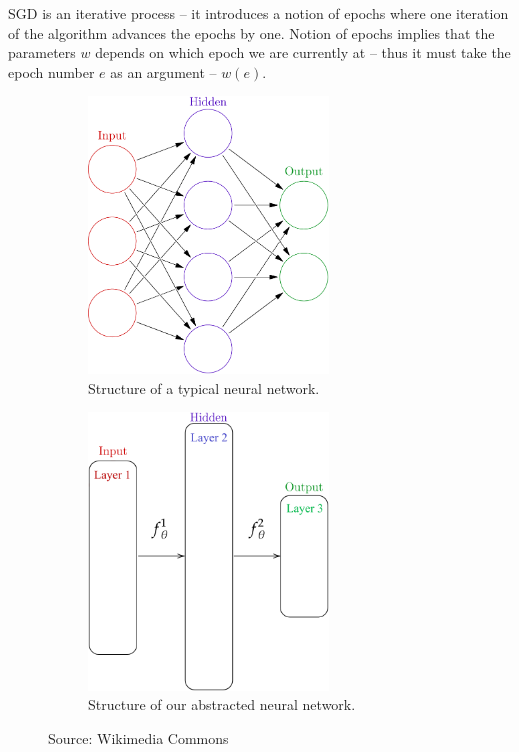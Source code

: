 \documentclass[dissertation.tex]{subfiles}
\begin{document}
SGD is an iterative process -- it introduces a notion of epochs where one
iteration of the algorithm advances the epochs by one. Notion of epochs implies
that the parameters $w$ depends on which epoch we are currently at -- thus it
must take the epoch number $e$ as an argument -- $w(e)$.


\begin{figure}[H]
  \centering
  \begin{subfigure}[t]{0.49\textwidth}
    \centering
    \includegraphics[width=0.7\textwidth]{figs/neural_network.png}
    \caption{
      Structure of a typical neural network.
    }
    \label{fig:nnOriginal}
  \end{subfigure}
  \hfill
  \begin{subfigure}[t]{0.49\textwidth}
    \centering
    \includegraphics[width=0.7\textwidth]{figs/neural_network_abstraction.png}
    \caption{
      Structure of our abstracted neural network.
    }
    \label{fig:nnModified}
  \end{subfigure}
    \caption{
      Source: Wikimedia Commons 
    }
\end{figure}
\end{document}
